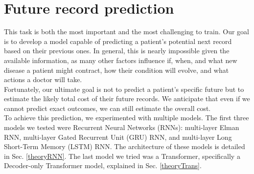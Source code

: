 
\section{Future record prediction}
\label{record_prediction}


This task is both the most important and the most challenging to train. Our goal is to develop a model capable of predicting a patient’s potential next record based on their previous ones. In general, this is nearly impossible given the available information, as many other factors influence if, when, and what new disease a patient might contract, how their condition will evolve, and what actions a doctor will take.
\\

Fortunately, our ultimate goal is not to predict a patient's specific future but to estimate the likely total cost of their future records. We anticipate that even if we cannot predict exact outcomes, we can still estimate the overall cost.
\\

To achieve this prediction, we experimented with multiple models. The first three models we tested were Recurrent Neural Networks (RNNs): multi-layer Elman RNN, multi-layer Gated Recurrent Unit (GRU) RNN, and multi-layer Long Short-Term Memory (LSTM) RNN. The architecture of these models is detailed in Sec. \ref{theoryRNN}. The last model we tried was a Transformer, specifically a Decoder-only Transformer model, explained in Sec. \ref{theoryTrans}.


